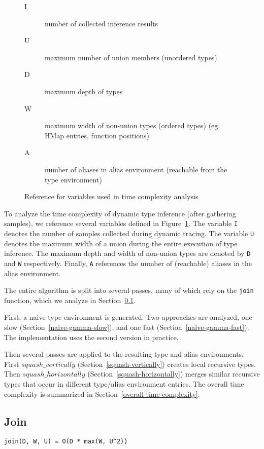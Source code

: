 \begin{figure}
\begin{mdframed}
\begin{description}
  \item [I] number of collected inference results
  \item [U] maximum number of union members (unordered types)
  \item [D] maximum depth of types
  \item [W] maximum width of non-union types (ordered types) (eg. HMap entries, function positions)
  \item [A] number of aliases in alias environment (reachable from the type environment)
\end{description}
\end{mdframed}
\caption{Reference for variables used in time complexity analysis}
\label{time-complexity-vars}
\end{figure}

To analyze the time complexity of dynamic type inference (after
gathering samples), we reference several variables 
defined in Figure~\ref{time-complexity-vars}.
The variable \texttt{I} denotes the number of samples
collected during dynamic tracing. The variable \texttt{U}
denotes the maximum width of a union during the entire execution
of type inference.
The maximum depth and width of non-union types are denoted by
\texttt{D} and \texttt{W} respectively.
Finally, \texttt{A} references the number of (reachable) aliases in the
alias environment.

The entire algorithm is split into several passes, many of which
rely on the \texttt{join} function, which we analyze in Section~\ref{join}.

First, a naive type environment is generated. Two approaches
are analyzed, 
one slow (Section~\ref{naive-gamma-slow}),
and one fast (Section~\ref{naive-gamma-fast}).
The implementation uses the second version in practice.

Then several passes are applied to the resulting type and
alias environments. First $squash\_vertically$
(Section~\ref{squash-vertically}) creates local recursive
types.
Then $squash\_horizontally$ (Section~\ref{squash-horizontally})
merges similar recursive types that occur in different type/alias
environment entries.
The overall time complexity is summarized in Section~\ref{overall-time-complexity}.

\subsection{Join}
\label{join}
\begin{verbatim}
join(D, W, U) = O(D * max(W, U^2))
\end{verbatim}

